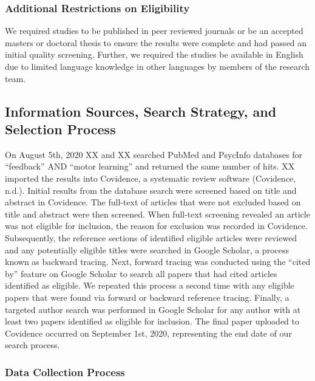 \documentclass[
  english,
  man, donotrepeattitle,mask,floatsintext]{apa7}
\begin{document}
\hypertarget{additional-restrictions-on-eligibility}{%
\subsubsection{Additional Restrictions on Eligibility}\label{additional-restrictions-on-eligibility}}

We required studies to be published in peer reviewed journals or be an accepted masters or doctoral thesis to ensure the results were complete and had passed an initial quality screening. Further, we required the studies be available in English due to limited language knowledge in other languages by members of the research team.

\hypertarget{information-sources-search-strategy-and-selection-process}{%
\subsection{Information Sources, Search Strategy, and Selection Process}\label{information-sources-search-strategy-and-selection-process}}

On August 5th, 2020 XX and XX searched PubMed and PsycInfo databases for ``feedback'' AND ``motor learning'' and returned the same number of hits. XX imported the results into Covidence, a systematic review software (Covidence, n.d.). Initial results from the database search were screened based on title and abstract in Covidence. The full-text of articles that were not excluded based on title and abstract were then screened. When full-text screening revealed an article was not eligible for inclusion, the reason for exclusion was recorded in Covidence. Subsequently, the reference sections of identified eligible articles were reviewed and any potentially eligible titles were searched in Google Scholar, a process known as backward tracing. Next, forward tracing was conducted using the ``cited by'' feature on Google Scholar to search all papers that had cited articles identified as eligible. We repeated this process a second time with any eligible papers that were found via forward or backward reference tracing. Finally, a targeted author search was performed in Google Scholar for any author with at least two papers identified as eligible for inclusion. The final paper uploaded to Covidence occurred on September 1st, 2020, representing the end date of our search process.

\hypertarget{data-collection-process}{%
\subsubsection{Data Collection Process}\label{data-collection-process}}
\end{document}
